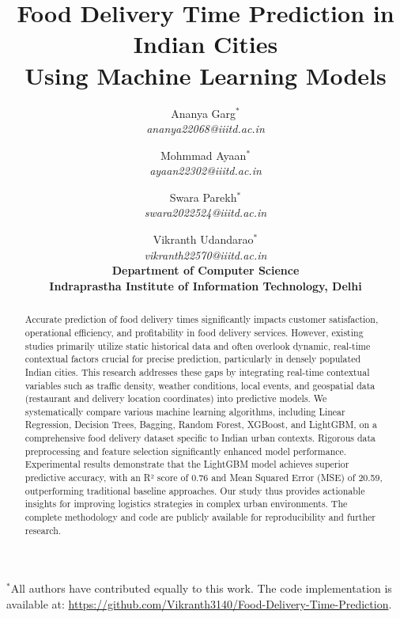 \documentclass[10pt,twocolumn,letterpaper]{article}
\begin{document}
\title{Food Delivery Time Prediction in Indian Cities \\ Using Machine Learning Models}

\author{
    Ananya Garg$^{*}$ \\ 
    \textit{ananya22068@iiitd.ac.in} 
    \and 
    Mohmmad Ayaan$^{*}$ \\ 
    \textit{ayaan22302@iiitd.ac.in} 
    \and 
    Swara Parekh$^{*}$ \\ 
    \textit{swara2022524@iiitd.ac.in} 
    \and 
    Vikranth Udandarao$^{*}$ \\ 
    \textit{vikranth22570@iiitd.ac.in} 
    \\[1.5em]
    \textbf{Department of Computer Science} \\
    \textbf{Indraprastha Institute of Information Technology, Delhi}
}

\maketitle

{\small
\noindent $^{*}$All authors have contributed equally to this work. The code implementation is available at: \url{https://github.com/Vikranth3140/Food-Delivery-Time-Prediction}.
}

\begin{abstract}
    Accurate prediction of food delivery times significantly impacts customer satisfaction, operational efficiency, and profitability in food delivery services. However, existing studies primarily utilize static historical data and often overlook dynamic, real-time contextual factors crucial for precise prediction, particularly in densely populated Indian cities. This research addresses these gaps by integrating real-time contextual variables such as traffic density, weather conditions, local events, and geospatial data (restaurant and delivery location coordinates) into predictive models. We systematically compare various machine learning algorithms, including Linear Regression, Decision Trees, Bagging, Random Forest, XGBoost, and LightGBM, on a comprehensive food delivery dataset specific to Indian urban contexts. Rigorous data preprocessing and feature selection significantly enhanced model performance. Experimental results demonstrate that the LightGBM model achieves superior predictive accuracy, with an R² score of 0.76 and Mean Squared Error (MSE) of 20.59, outperforming traditional baseline approaches. Our study thus provides actionable insights for improving logistics strategies in complex urban environments. The complete methodology and code are publicly available for reproducibility and further research.
\end{abstract}
\end{document}

